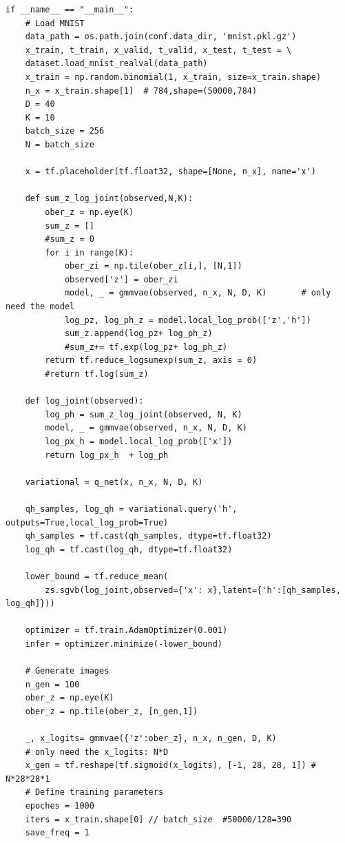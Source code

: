 \documentclass[a4paper]{article}
\begin{document}
\begin{verbatim}
if __name__ == "__main__":
    # Load MNIST
    data_path = os.path.join(conf.data_dir, 'mnist.pkl.gz')
    x_train, t_train, x_valid, t_valid, x_test, t_test = \
    dataset.load_mnist_realval(data_path)
    x_train = np.random.binomial(1, x_train, size=x_train.shape)
    n_x = x_train.shape[1]  # 784,shape=(50000,784)
    D = 40
    K = 10
    batch_size = 256
    N = batch_size

    x = tf.placeholder(tf.float32, shape=[None, n_x], name='x')
    
    def sum_z_log_joint(observed,N,K):
        ober_z = np.eye(K)
        sum_z = []
        #sum_z = 0
        for i in range(K):
            ober_zi = np.tile(ober_z[i,], [N,1])
            observed['z'] = ober_zi 
            model, _ = gmmvae(observed, n_x, N, D, K)       # only need the model
            log_pz, log_ph_z = model.local_log_prob(['z','h'])
            sum_z.append(log_pz+ log_ph_z)
            #sum_z+= tf.exp(log_pz+ log_ph_z)
        return tf.reduce_logsumexp(sum_z, axis = 0)
        #return tf.log(sum_z)

    def log_joint(observed):
        log_ph = sum_z_log_joint(observed, N, K)
        model, _ = gmmvae(observed, n_x, N, D, K)        
        log_px_h = model.local_log_prob(['x'])
        return log_px_h  + log_ph

    variational = q_net(x, n_x, N, D, K)

    qh_samples, log_qh = variational.query('h', outputs=True,local_log_prob=True)
    qh_samples = tf.cast(qh_samples, dtype=tf.float32)
    log_qh = tf.cast(log_qh, dtype=tf.float32)

    lower_bound = tf.reduce_mean(
        zs.sgvb(log_joint,observed={'x': x},latent={'h':[qh_samples, log_qh]}))

    optimizer = tf.train.AdamOptimizer(0.001)
    infer = optimizer.minimize(-lower_bound)

    # Generate images
    n_gen = 100
    ober_z = np.eye(K)
    ober_z = np.tile(ober_z, [n_gen,1])

    _, x_logits= gmmvae({'z':ober_z}, n_x, n_gen, D, K)
    # only need the x_logits: N*D
    x_gen = tf.reshape(tf.sigmoid(x_logits), [-1, 28, 28, 1]) # N*28*28*1
    # Define training parameters
    epoches = 1000
    iters = x_train.shape[0] // batch_size  #50000/128=390
    save_freq = 1


\end{verbatim}
\end{document}
